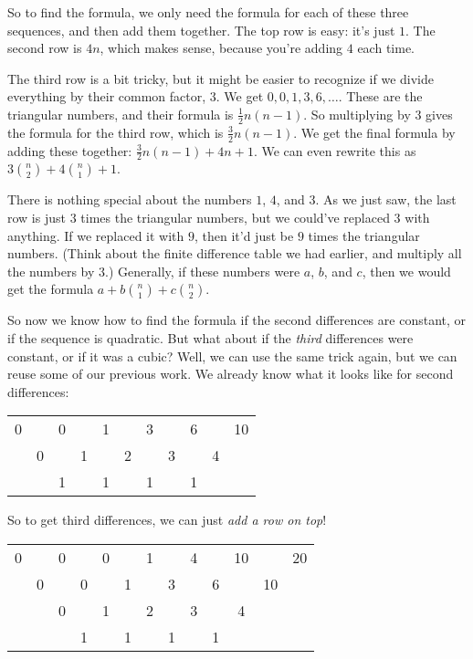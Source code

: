 \documentclass[11pt,paper=letter]{scrartcl}
\begin{document}
So to find the formula, we only need the formula for each of these three sequences, and then add them together. The top row is easy: it's just $1$. The second row is $4n$, which makes sense, because you're adding $4$ each time.

The third row is a bit tricky, but it might be easier to recognize if we divide everything by their common factor, $3$. We get $0, 0, 1, 3, 6, \ldots$. These are the triangular numbers, and their formula is $\frac{1}{2}n(n-1)$. So multiplying by $3$ gives the formula for the third row, which is $\frac{3}{2}n(n-1)$. We get the final formula by adding these together: $\frac{3}{2}n(n-1) + 4n + 1$. We can even rewrite this as $3\binom{n}{2} + 4\binom{n}{1} + 1$.

There is nothing special about the numbers $1$, $4$, and $3$. As we just saw, the last row is just $3$ times the triangular numbers, but we could've replaced $3$ with anything. If we replaced it with $9$, then it'd just be $9$ times the triangular numbers. (Think about the finite difference table we had earlier, and multiply all the numbers by $3$.) Generally, if these numbers were $a$, $b$, and $c$, then we would get the formula $a + b\binom{n}{1} + c\binom{n}{2}$.

So now we know how to find the formula if the second differences are constant, or if the sequence is quadratic. But what about if the \textit{third} differences were constant, or if it was a cubic? Well, we can use the same trick again, but we can reuse some of our previous work. We already know what it looks like for second differences:

\begin{center}
\begin{tabular}{ccccccccccc}
0 &   & 0 &   & 1  &    &  3 &    & 6 &   & 10 \\
  & 0 &   & 1 &    & 2  &    &  3 &   & 4 &    \\
  &   & 1 &   & 1  &    & 1  &    & 1 &   & 
\end{tabular}
\end{center}

So to get third differences, we can just \textit{add a row on top}!

\begin{center}
\begin{tabular}{ccccccccccccc}
0 & & 0 &   & 0 &    & 1   &   &  4 &   &10 &    & 20 \\
& 0 &   & 0 &   & 1  &    &  3 &    & 6 &   & 10 & \\
&   & 0 &   & 1 &    & 2  &    &  3 &   & 4 &    & \\
&   &   & 1 &   & 1  &    & 1  &    & 1 &   &    & 
\end{tabular}
\end{center}
\end{document}
